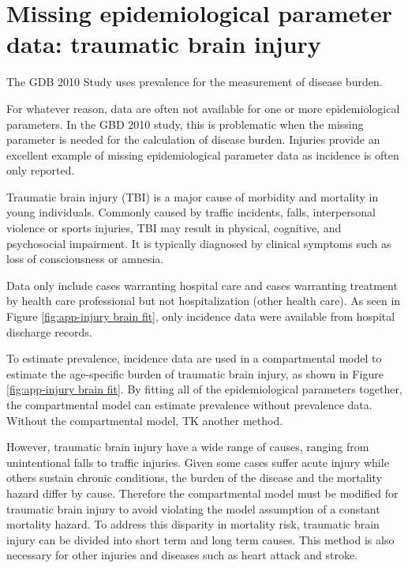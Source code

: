 \chapter{Missing epidemiological parameter data: traumatic brain injury}
\label{applications-double_dismod}

The GDB 2010 Study uses prevalence for the measurement of disease burden.

For whatever reason, data are often not available for one or more
epidemiological parameters.  In the GBD 2010 study, this is
problematic when the missing parameter is needed for the calculation
of disease burden.  Injuries provide an excellent example of missing
epidemiological parameter data as incidence is often only reported.

Traumatic brain injury (TBI) is a major cause of morbidity and 
mortality in young individuals. Commonly caused by traffic
incidents, falls, interpersonal violence or sports injuries, 
TBI may result in physical, cognitive, and psychosocial impairment.
It is typically diagnosed by clinical symptoms such as loss of 
consciousness or amnesia. \cite{maas_moderate_2008, nih_rehabilitation_1999,
bruns_epidemiology_2003}

Data only include cases warranting hospital care and cases warranting
treatment by health care professional but not hospitalization (other
health care).  As seen in Figure \ref{fig:app-injury brain fit},
only incidence data were available from hospital discharge records.

To estimate prevalence, incidence data are used in a compartmental model to estimate the
age-specific burden of traumatic brain injury, as shown in Figure
\ref{fig:app-injury brain fit}.  By fitting all of the epidemiological
parameters together, the compartmental model can estimate prevalence
without prevalence data.  Without the compartmental model, TK another method.

However, traumatic brain injury have a wide range of
causes, ranging from unintentional falls to traffic injuries.
Given some cases suffer acute injury while others sustain
chronic conditions, the burden of the disease and the mortality hazard
differ by cause.  Therefore the compartmental model must be modified
for traumatic brain injury to avoid violating the model assumption of a
constant mortality hazard.  To address this disparity in mortality
risk, traumatic brain injury can be divided into short term and long term
causes.  This method is also necessary for other injuries and
diseases such as heart attack and stroke.

